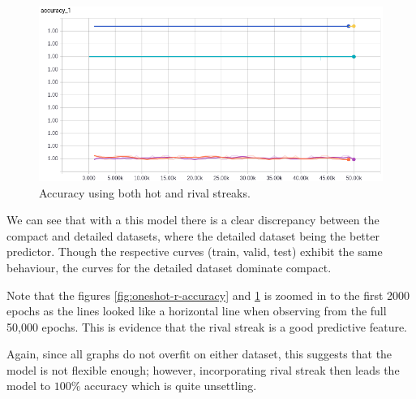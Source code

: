 \documentclass{article} %
\begin{document}
\begin{figure}[!htb]
\endminipage
{}%
  \includegraphics[width=\linewidth]{plots/model1/oneshot/streak-hr/accuracy.png}
  \caption{Accuracy using both hot and rival streaks.}\label{fig:oneshot-hr-accuracy}
\endminipage
\end{figure}
\label{fig:oneshot-accuracies}

We can see that with a this model there is a clear discrepancy between the compact and detailed datasets, where the detailed dataset being the better predictor.
Though the respective curves (train, valid, test) exhibit the same behaviour, the curves for the detailed dataset dominate compact.

Note that the figures \ref{fig:oneshot-r-accuracy} and \ref{fig:oneshot-hr-accuracy} is zoomed in to the first 2000 epochs as the lines looked like a horizontal line when observing from the full 50,000 epochs.  This is evidence that the rival streak is a good predictive feature.

Again, since all graphs do not overfit on either dataset, this suggests that the model is not flexible enough; however, incorporating rival streak then leads the model to $100\%$ accuracy which is quite unsettling.
\end{document}
